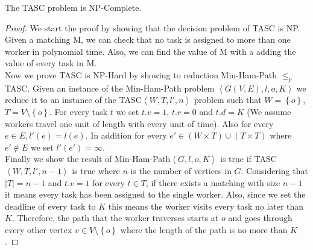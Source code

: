 \begin{theorem}
\label{th:TASC}
The TASC problem is NP-Complete.
\end{theorem}

\begin{proof}
We start the proof by showing that the decision problem of TASC is NP. Given a matching M, we can check that no task is assigned to more than one worker in polynomial time. Also, we can find the value of M with a adding the value of every task in M.\\

Now we prove TASC is NP-Hard by showing to reduction Min-Ham-Path $\leq_p$ TASC. Given an instance of the Min-Ham-Path problem $\left\langle G(V,E), l, o, K \right\rangle$ we reduce it to an instance of the TASC$\left\langle W, T, l', n \right\rangle$ problem such that $W = \left\{ o \right\}$, $T = V \setminus \left\{ o \right\}$. For every task $t$ we set $t.v = 1$, $t.r = 0$ and $t.d = K$ (We assume workers travel one unit of length with every unit of time). Also for every $e \in E, l'(e) = l(e)$. In addition for every $e' \in \left( W \times T \right) \cup \left( T \times T \right) $ where $e' \not\in E$ we set $l'(e') = \infty$.\\ 

Finally we show the result of Min-Ham-Path$\left\langle G, l, o, K \right\rangle$ is true if TASC$\left\langle W, T, l', n-1 \right\rangle$ is true where $n$ is the number of vertices in $G$. Considering that $\left\vert T \right\vert = n - 1$ and $t.v = 1$ for every $t \in T$, if there exists a matching with size $n - 1$ it means every task has been assigned to the single worker. Also, since we set the deadline of every task to $K$ this means the worker visits every task no later than $K$. Therefore, the path that the worker traverses starts at $o$ and goes through every other vertex $v \in V \setminus \left\{ o \right\}$ where the length of the path is no more than $K$.
\end{proof}